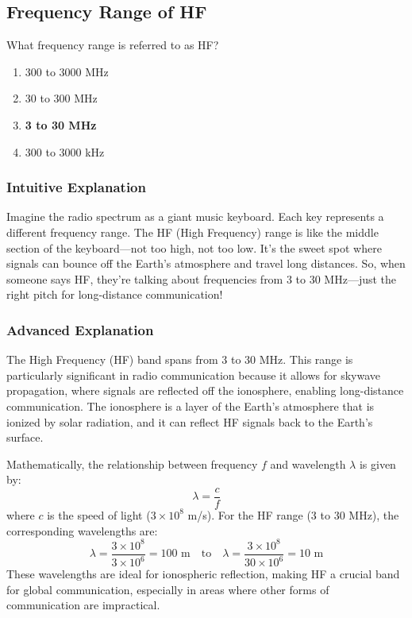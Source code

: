 \subsection{Frequency Range of HF}
\label{T3B10}

\begin{tcolorbox}[colback=gray!10!white,colframe=black!75!black,title=T3B10]
What frequency range is referred to as HF?
\begin{enumerate}[label=\Alph*)]
    \item 300 to 3000 MHz
    \item 30 to 300 MHz
    \item \textbf{3 to 30 MHz}
    \item 300 to 3000 kHz
\end{enumerate}
\end{tcolorbox}

\subsubsection{Intuitive Explanation}
Imagine the radio spectrum as a giant music keyboard. Each key represents a different frequency range. The HF (High Frequency) range is like the middle section of the keyboard—not too high, not too low. It’s the sweet spot where signals can bounce off the Earth’s atmosphere and travel long distances. So, when someone says HF, they’re talking about frequencies from 3 to 30 MHz—just the right pitch for long-distance communication!

\subsubsection{Advanced Explanation}
The High Frequency (HF) band spans from 3 to 30 MHz. This range is particularly significant in radio communication because it allows for skywave propagation, where signals are reflected off the ionosphere, enabling long-distance communication. The ionosphere is a layer of the Earth's atmosphere that is ionized by solar radiation, and it can reflect HF signals back to the Earth's surface.

Mathematically, the relationship between frequency \( f \) and wavelength \( \lambda \) is given by:
\[
\lambda = \frac{c}{f}
\]
where \( c \) is the speed of light (\( 3 \times 10^8 \) m/s). For the HF range (3 to 30 MHz), the corresponding wavelengths are:
\[
\lambda = \frac{3 \times 10^8}{3 \times 10^6} = 100 \text{ m} \quad \text{to} \quad \lambda = \frac{3 \times 10^8}{30 \times 10^6} = 10 \text{ m}
\]
These wavelengths are ideal for ionospheric reflection, making HF a crucial band for global communication, especially in areas where other forms of communication are impractical.

